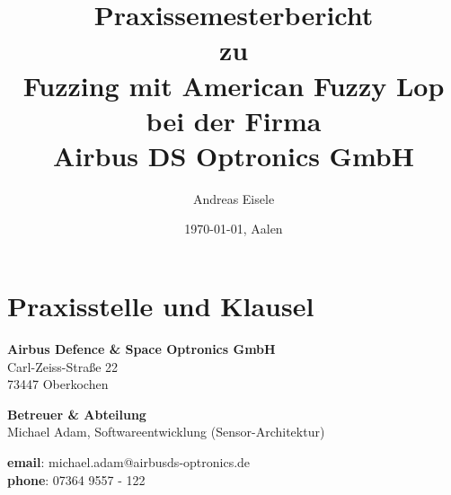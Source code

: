 \documentclass[12pt,a4paper]{scrreprt}
\begin{document}

\begin{titlepage}

\centering

\title{Praxissemesterbericht \\  
\vspace{1cm} \large zu \\ 
\vspace{1cm}  Fuzzing mit American Fuzzy Lop \\
\vspace{0.5cm} bei der Firma \\
\vspace{0.5cm} Airbus DS Optronics GmbH \vspace{1.5cm}}



\author{Andreas Eisele}

\vspace{1.5cm}

\date{\today{}, Aalen}
\maketitle
\end{titlepage}


\tableofcontents

\newpage
\renewcommand{\thesection}{\arabic{section}}


\chapter{Praxisstelle und Klausel}



\begin{minipage}{1\textwidth}

\textbf{Airbus Defence \& Space Optronics GmbH} \\
Carl-Zeiss-Straße 22 \\
73447 Oberkochen

\vspace{2cm}

\textbf{Betreuer \& Abteilung} \\
Michael Adam, Softwareentwicklung (Sensor-Architektur) \\


\vspace{0.5cm}

\textbf{email}:  michael.adam@airbusds-optronics.de \\
\textbf{phone}: 07364 9557 - 122
	

\end{minipage}
\end{document}
